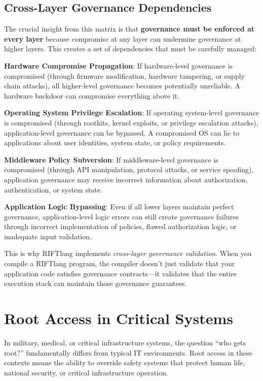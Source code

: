 \subsection{Cross-Layer Governance Dependencies}

The crucial insight from this matrix is that \textbf{governance must be enforced at every layer} because compromise at any layer can undermine governance at higher layers. This creates a set of dependencies that must be carefully managed:

\textbf{Hardware Compromise Propagation}: If hardware-level governance is compromised (through firmware modification, hardware tampering, or supply chain attacks), all higher-level governance becomes potentially unreliable. A hardware backdoor can compromise everything above it.

\textbf{Operating System Privilege Escalation}: If operating system-level governance is compromised (through rootkits, kernel exploits, or privilege escalation attacks), application-level governance can be bypassed. A compromised OS can lie to applications about user identities, system state, or policy requirements.

\textbf{Middleware Policy Subversion}: If middleware-level governance is compromised (through API manipulation, protocol attacks, or service spoofing), application governance may receive incorrect information about authorization, authentication, or system state.

\textbf{Application Logic Bypassing}: Even if all lower layers maintain perfect governance, application-level logic errors can still create governance failures through incorrect implementation of policies, flawed authorization logic, or inadequate input validation.

This is why RIFTlang implements \textit{cross-layer governance validation}. When you compile a RIFTlang program, the compiler doesn't just validate that your application code satisfies governance contracts—it validates that the entire execution stack can maintain those governance guarantees.

\section{Root Access in Critical Systems}

In military, medical, or critical infrastructure systems, the question ``who gets root?'' fundamentally differs from typical IT environments. Root access in these contexts means the ability to override safety systems that protect human life, national security, or critical infrastructure operation.


